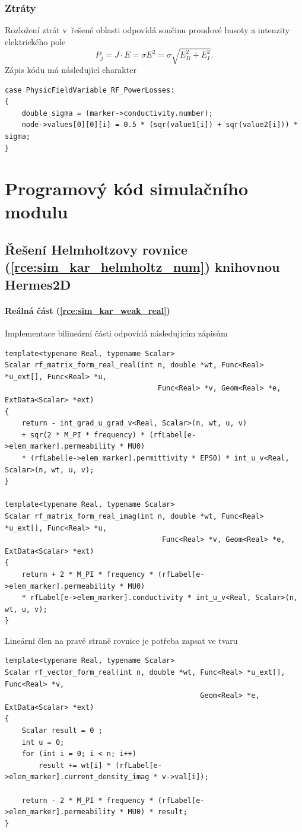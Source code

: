 \subsection*{Ztráty}
Rozložení ztrát v~řešené oblasti odpovídá součinu proudové husoty a intenzity elektrického pole 
\begin{displaymath}
	P_j = J \cdot E = \sigma E^{2} = \sigma \sqrt{E_{R}^{2} + E_{I}^{2}}.
\end{displaymath}
Zápis kódu má následující charakter
\begin{verbatim}
case PhysicFieldVariable_RF_PowerLosses:
{
    double sigma = (marker->conductivity.number);
    node->values[0][0][i] = 0.5 * (sqr(value1[i]) + sqr(value2[i])) * sigma;
}
\end{verbatim}


\chapter{Programový kód simulačního modulu} \label{kap:Program_kod}
\section{Řešení Helmholtzovy rovnice (\ref{rce:sim_kar_helmholtz_num}) knihovnou Hermes2D}
\subsubsection*{Reálná část (\ref{rce:sim_kar_weak_real})}
Implementace bilineární části odpovídá následujícím zápisům
\begin{verbatim}
template<typename Real, typename Scalar>
Scalar rf_matrix_form_real_real(int n, double *wt, Func<Real> *u_ext[], Func<Real> *u,
                                    Func<Real> *v, Geom<Real> *e, ExtData<Scalar> *ext)
{
    return - int_grad_u_grad_v<Real, Scalar>(n, wt, u, v)
    + sqr(2 * M_PI * frequency) * (rfLabel[e->elem_marker].permeability * MU0)
    * (rfLabel[e->elem_marker].permittivity * EPS0) * int_u_v<Real, Scalar>(n, wt, u, v);
}

template<typename Real, typename Scalar>
Scalar rf_matrix_form_real_imag(int n, double *wt, Func<Real> *u_ext[], Func<Real> *u,
                                     Func<Real> *v, Geom<Real> *e, ExtData<Scalar> *ext)
{
    return + 2 * M_PI * frequency * (rfLabel[e->elem_marker].permeability * MU0) 
    * rfLabel[e->elem_marker].conductivity * int_u_v<Real, Scalar>(n, wt, u, v);
}

\end{verbatim}
Lineární člen na pravé straně rovnice je potřeba zapsat ve tvaru
\begin{verbatim}
template<typename Real, typename Scalar>
Scalar rf_vector_form_real(int n, double *wt, Func<Real> *u_ext[], Func<Real> *v,
                                              Geom<Real> *e, ExtData<Scalar> *ext)
{
    Scalar result = 0 ;
    int u = 0;
    for (int i = 0; i < n; i++)
        result += wt[i] * (rfLabel[e->elem_marker].current_density_imag * v->val[i]);

    return - 2 * M_PI * frequency * (rfLabel[e->elem_marker].permeability * MU0) * result;
}
\end{verbatim}

